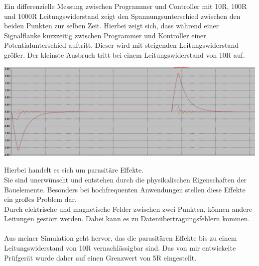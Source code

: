 \documentclass[a4paper,11pt]{scrartcl}
\begin{document}
\newpage

Ein differenzielle Messung zwischen Programmer und Controller mit 10R, 100R und 1000R Leitungswiderstand  zeigt den Spannungsunterschied zwischen den beiden Punkten zur selben Zeit. Hierbei zeigt sich, dass während einer Signalflanke kurzzeitig zwischen Programmer und Kontroller einer Potentialunterschied auftritt. Dieser wird mit steigenden Leitungswiderstand größer. Der kleinste Ausbruch tritt bei einem Leitungswiderstand von 10R auf.


\begin{center}
\includegraphics[width=17cm]{Bilder/LTC-SIGNALVERLAUF2.png}
\end{center}

Hierbei handelt es sich um parasitäre Effekte. 
\\
Sie sind unerwünscht und entstehen durch die physikalischen Eigenschaften der Bauelemente. Besonders bei hochfrequenten Anwendungen stellen diese Effekte ein großes Problem dar.
\\
Durch elektrische und magnetische Felder zwischen zwei Punkten, können andere Leitungen gestört werden. Dabei kann es zu Datenübertragungsfehlern kommen.
\\
\\
Aus meiner Simulation geht hervor, das die parasitären Effekte bis zu einem Leitungswiderstand von 10R vernachlässigbar sind. Das von mir entwickelte Prüfgerät wurde daher auf einen Grenzwert von 5R eingestellt. 
\end{document}
